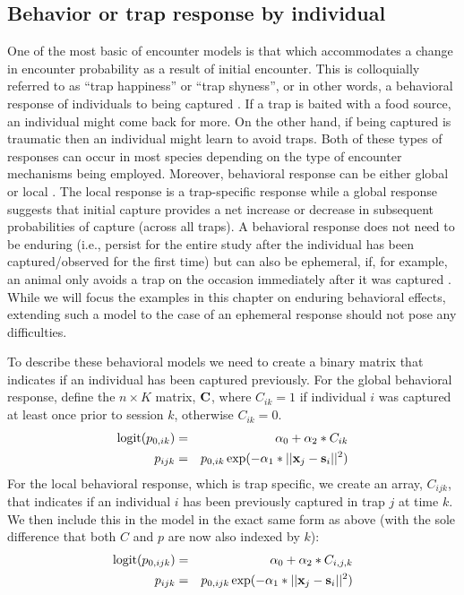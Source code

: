 \subsection{Behavior or trap response by individual}
\label{covariates.sec.behavior}

One of the most basic of encounter models is that which accommodates a
change in encounter probability as a result of initial encounter.
This is colloquially referred to as ``trap happiness'' or ``trap shyness'', or in other words, a
behavioral response of individuals to being captured \citep{otis_etal:1978}.
If a trap is baited
with a food source, an individual might come back for
more. On the other hand, if being captured is traumatic then an
individual might learn to avoid traps. Both of these types of
responses can occur in most species depending on the type of encounter
mechanisms being employed. Moreover, behavioral response can be either
global \citep{gardner_etal:2010jwm} or local  \citep{royle_etal:2011jwm}.
The local response is a trap-specific response 
while a global response suggests that initial capture provides a net
increase or decrease in subsequent probabilities of capture (across
all traps). A behavioral response does not need to be enduring (i.e., persist
for the entire study after the individual has been captured/observed
for the first time) but can also be ephemeral, if, for example, an
animal only avoids a trap on the occasion immediately after it was
captured \citep{yang_chao:2005, royle:2008}. While we will focus the
examples in this chapter on enduring behavioral effects, extending
such a model to the case of an ephemeral response should not pose any
difficulties.

To describe these behavioral models we need to create a binary matrix that indicates
if an individual has been captured previously.  For the global
behavioral response, define the $n \times K$ matrix,
${\bf C}$, where $C_{ik} =1$
if individual $i$ was captured at least once prior to session
$k$, otherwise $C_{ik} = 0$.
\begin{eqnarray*}
\mbox{logit}(p_{0,ik})& =& \alpha_{0} + \alpha_{2}*C_{ik} \\
p_{ijk} &= &p_{0,ik} \exp(- \alpha_{1}*||{\bf x}_{j}-{\bf s}_{i}||^2)
\end{eqnarray*}
For the local behavioral response, which is trap specific, we create
an array, $C_{ijk}$, that indicates if an individual $i$ has been
previously captured in trap $j$ at time $k$.  We then include this in
the model in the exact same form as above (with the sole difference that both $C$ and $p$ 
are now also indexed by $k$):
\begin{eqnarray*}
\mbox{logit}(p_{0,ijk}) &= &\alpha_{0} + \alpha_{2}*C_{i,j,k} \\
          p_{ijk} &= &  p_{0,ijk} \exp(- \alpha_{1}*||{\bf x}_{j}-{\bf s}_{i}||^2)
\end{eqnarray*}

